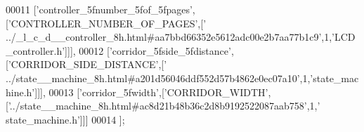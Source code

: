 \begin{DoxyCode}
00011   [\textcolor{stringliteral}{'controller\_5fnumber\_5fof\_5fpages'},[\textcolor{stringliteral}{'CONTROLLER\_NUMBER\_OF\_PAGES'},[\textcolor{stringliteral}{'
      ../\_l\_c\_d\_\_controller\_8h.html#aa7bbd66352e5612adc00e2b7aa77b1c9'},1,\textcolor{stringliteral}{'LCD\_controller.h'}]]],
00012   [\textcolor{stringliteral}{'corridor\_5fside\_5fdistance'},[\textcolor{stringliteral}{'CORRIDOR\_SIDE\_DISTANCE'},[\textcolor{stringliteral}{'
      ../state\_\_machine\_8h.html#a201d56046ddf552d57b4862e0ec07a10'},1,\textcolor{stringliteral}{'state\_machine.h'}]]],
00013   [\textcolor{stringliteral}{'corridor\_5fwidth'},[\textcolor{stringliteral}{'CORRIDOR\_WIDTH'},[\textcolor{stringliteral}{'../state\_\_machine\_8h.html#ac8d21b48b36c2d8b9192522087aab758'},1,\textcolor{stringliteral}{'
      state\_machine.h'}]]]
00014 ];
\end{DoxyCode}
